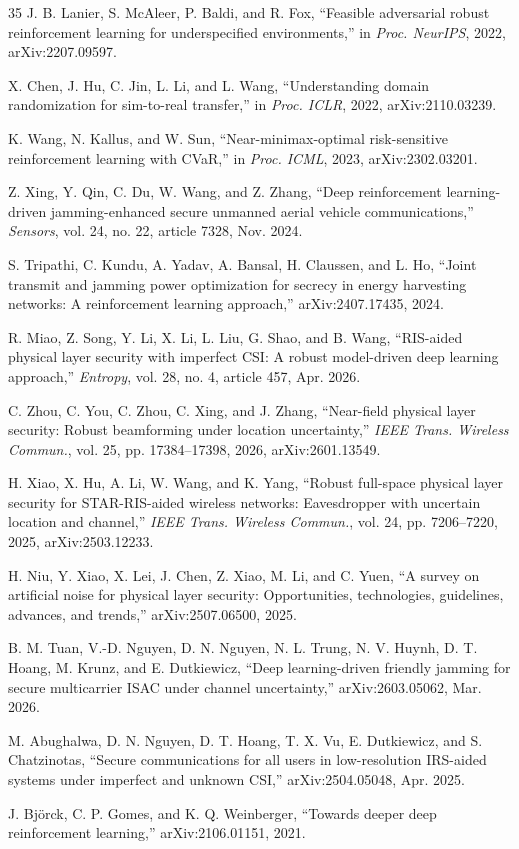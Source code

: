 \documentclass[conference]{IEEEtran}
\begin{document}
\begin{thebibliography}{35}
J. B. Lanier, S. McAleer, P. Baldi, and R. Fox, ``Feasible adversarial robust reinforcement learning for underspecified environments,'' in \emph{Proc. NeurIPS}, 2022, arXiv:2207.09597.

X. Chen, J. Hu, C. Jin, L. Li, and L. Wang, ``Understanding domain randomization for sim-to-real transfer,'' in \emph{Proc. ICLR}, 2022, arXiv:2110.03239.

K. Wang, N. Kallus, and W. Sun, ``Near-minimax-optimal risk-sensitive reinforcement learning with CVaR,'' in \emph{Proc. ICML}, 2023, arXiv:2302.03201.

Z. Xing, Y. Qin, C. Du, W. Wang, and Z. Zhang, ``Deep reinforcement learning-driven jamming-enhanced secure unmanned aerial vehicle communications,'' \emph{Sensors}, vol. 24, no. 22, article 7328, Nov. 2024.

S. Tripathi, C. Kundu, A. Yadav, A. Bansal, H. Claussen, and L. Ho, ``Joint transmit and jamming power optimization for secrecy in energy harvesting networks: A reinforcement learning approach,'' arXiv:2407.17435, 2024.

R. Miao, Z. Song, Y. Li, X. Li, L. Liu, G. Shao, and B. Wang, ``RIS-aided physical layer security with imperfect CSI: A robust model-driven deep learning approach,'' \emph{Entropy}, vol. 28, no. 4, article 457, Apr. 2026.

C. Zhou, C. You, C. Zhou, C. Xing, and J. Zhang, ``Near-field physical layer security: Robust beamforming under location uncertainty,'' \emph{IEEE Trans. Wireless Commun.}, vol. 25, pp. 17384--17398, 2026, arXiv:2601.13549.

H. Xiao, X. Hu, A. Li, W. Wang, and K. Yang, ``Robust full-space physical layer security for STAR-RIS-aided wireless networks: Eavesdropper with uncertain location and channel,'' \emph{IEEE Trans. Wireless Commun.}, vol. 24, pp. 7206--7220, 2025, arXiv:2503.12233.

H. Niu, Y. Xiao, X. Lei, J. Chen, Z. Xiao, M. Li, and C. Yuen, ``A survey on artificial noise for physical layer security: Opportunities, technologies, guidelines, advances, and trends,'' arXiv:2507.06500, 2025.

B. M. Tuan, V.-D. Nguyen, D. N. Nguyen, N. L. Trung, N. V. Huynh, D. T. Hoang, M. Krunz, and E. Dutkiewicz, ``Deep learning-driven friendly jamming for secure multicarrier ISAC under channel uncertainty,'' arXiv:2603.05062, Mar. 2026.

M. Abughalwa, D. N. Nguyen, D. T. Hoang, T. X. Vu, E. Dutkiewicz, and S. Chatzinotas, ``Secure communications for all users in low-resolution IRS-aided systems under imperfect and unknown CSI,'' arXiv:2504.05048, Apr. 2025.

J. Bj\"orck, C. P. Gomes, and K. Q. Weinberger, ``Towards deeper deep reinforcement learning,'' arXiv:2106.01151, 2021.

\end{thebibliography}
\end{document}
